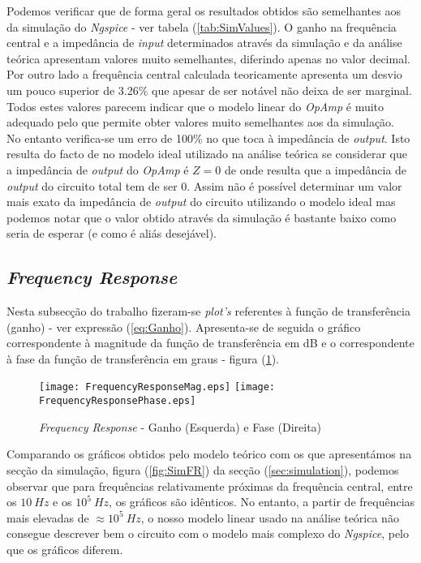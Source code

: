 Podemos verificar que de forma geral os resultados obtidos são semelhantes aos da simulação do \emph{Ngspice} - ver tabela (\ref{tab:SimValues}). 
O ganho na frequência central e a impedância de \emph{input} determinados através da simulação e da análise teórica apresentam 
valores muito semelhantes, diferindo apenas no valor decimal. Por outro lado a frequência central calculada teoricamente
apresenta um desvio um pouco superior de 3.26\% que apesar de ser notável não deixa de ser marginal.
\\
Todos estes valores parecem indicar que o modelo linear do \emph{OpAmp} é muito adequado pelo que permite obter valores muito semelhantes aos da
simulação.
\\
No entanto verifica-se um erro de 100\% no que toca à impedância de \emph{output}. Isto resulta do facto de no modelo ideal utilizado na análise teórica
se considerar que a impedância de \emph{output} do \emph{OpAmp} é $Z = 0$ de onde resulta que a impedância de \emph{output} do circuito total
tem de ser 0. Assim não é possível determinar um valor mais exato da impedância de \emph{output} do circuito utilizando o modelo ideal mas
podemos notar que o valor obtido através da simulação é bastante baixo como seria de esperar (e como é aliás desejável).


\subsection{\emph{Frequency Response}}

Nesta subsecção do trabalho fizeram-se \emph{plot's} referentes à função de transferência (ganho) - ver expressão (\ref{eq:Ganho}).
Apresenta-se de seguida o gráfico correspondente à magnitude da função de transferência em dB e o correspondente à
fase da função de transferência em graus - figura (\ref{fig:FrequencyResponseAna}).

\begin{figure}[H]
    \centering
    \texttt{[image: FrequencyResponseMag.eps]}
    \texttt{[image: FrequencyResponsePhase.eps]}
    \caption{\emph{Frequency Response} - Ganho (Esquerda) e Fase (Direita)}
    \label{fig:FrequencyResponseAna}
\end{figure}

Comparando os gráficos obtidos pelo modelo teórico com os que apresentámos na secção da simulação, figura (\ref{fig:SimFR}) da secção
(\ref{sec:simulation}), podemos observar que para frequências relativamente próximas da frequência central, entre os $10 \: Hz$ e os
$10^5 \: Hz$, os gráficos são idênticos. No entanto, a partir de frequências mais elevadas de $\approx 10^5 \: Hz$, o nosso modelo linear
usado na análise teórica não consegue descrever bem o circuito com o modelo mais complexo do \emph{Ngspice}, pelo que os gráficos diferem.